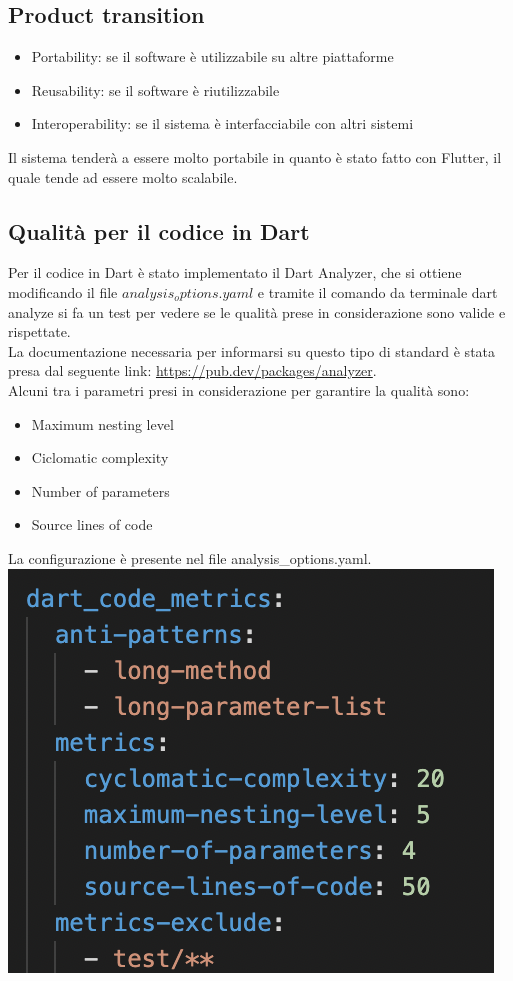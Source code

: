 \documentclass{article}
\begin{document}
\subsection{Product transition}
\begin{itemize}
    \item Portability: se il software è utilizzabile su altre piattaforme
    \item Reusability: se il software è riutilizzabile
    \item Interoperability: se il sistema è interfacciabile con altri sistemi
\end{itemize}
Il sistema tenderà a essere molto portabile in quanto è stato fatto con Flutter, il quale
tende ad essere molto scalabile.

\subsection{Qualità per il codice in Dart}
Per il codice in Dart è stato implementato il Dart Analyzer, che si ottiene modificando il file
$analysis_options.yaml$ e tramite il comando da terminale dart analyze si fa un test per 
vedere se le qualità prese in considerazione sono valide e rispettate.
\\La documentazione necessaria per informarsi su questo tipo di standard è stata presa
dal seguente link: \url{https://pub.dev/packages/analyzer}.
\\Alcuni tra i parametri presi in considerazione per garantire la qualità sono:

\begin{itemize}
    \item Maximum nesting level
    \item Ciclomatic complexity
    \item Number of parameters
    \item Source lines of code
\end{itemize}
La configurazione è presente nel file analysis\_options.yaml.
\\\includegraphics[scale = 0.5]{"Immagini/ParametriQuality.png"}
\end{document}
